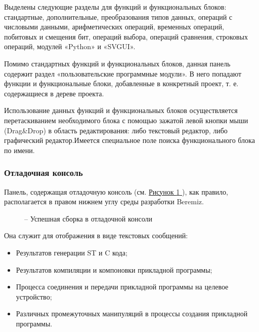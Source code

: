 \documentclass[letterpaper,10pt,russian]{sphinxmanual}
\begin{document}
Выделены следующие разделы для функций и функциональных блоков:
стандартные, дополнительные, преобразования типов данных, операций с
числовыми данными, арифметических операций, временных операций,
побитовых и смещения бит, операций выбора, операций сравнения, строковых
операций, модулей «Python» и «SVGUI».

Помимо стандартных функций и функциональных блоков, данная панель
содержит раздел «пользовательские программные модули». В него попадают
функции и функциональные блоки, добавленные в конкретный проект, т. е.
содержащиеся в дереве проекта.

Использование данных функций и функциональных блоков осуществляется
перетаскиванием необходимого блока с помощью зажатой левой кнопки мыши
(Drag\&Drop) в область редактирования: либо текстовый редактор, либо
графический редактор.Имеется специальное поле поиска
функционального блока по имени.


\subsubsection{Отладочная консоль}
\label{usage_guide/ide_components:id10}
Панель, содержащая отладочную консоль (см. \hyperref[usage_guide/ide_components:image132]{Рисунок \ref{usage_guide/ide_components:image132} }), как правило,
располагается в правом нижнем углу среды разработки Beremiz.
\begin{figure}[htbp]
\centering
\capstart

\noindent{}
\caption{– Успешная сборка в отладочной консоли}\label{usage_guide/ide_components:image132}\end{figure}

Она служит для отображения в виде текстовых сообщений:
\begin{itemize}
\item {} 
Результатов генерации ST и C кода;

\item {} 
Результатов компиляции и компоновки прикладной программы;

\item {} 
Процесса соединения и передачи прикладной программы на целевое
устройство;

\item {} 
Различных промежуточных манипуляций в процессы создания прикладной
программы.

\end{itemize}
\end{document}
